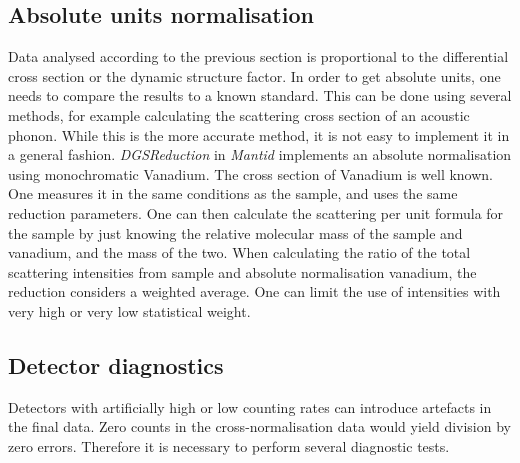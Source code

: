  
\subsection{Absolute units normalisation}
Data analysed according to the previous section is proportional to the differential cross section or the dynamic structure factor. In order to get absolute units, one needs to compare the results to a known standard. This can be done using several methods, for example calculating the scattering cross section of an acoustic phonon. While this is the more accurate method, it is not easy to implement it in a general fashion. \textit{DGSReduction} in \textit{Mantid} implements an absolute normalisation using monochromatic Vanadium. The cross section of Vanadium is well known. One measures it in the same conditions as the sample, and uses the same reduction parameters. One can then calculate the scattering per unit formula for the sample by just knowing the relative molecular mass of the sample and vanadium, and the mass of the two. When calculating the ratio of the total scattering intensities from sample and absolute normalisation vanadium, the reduction considers a weighted average. One can limit the use of intensities with very high or very low statistical weight. 


\subsection{Detector diagnostics}\label{sec:Physics-detdiag}
Detectors with artificially high or low counting rates can introduce artefacts in the final data. Zero counts in the cross-normalisation data would yield division by zero errors. Therefore it is necessary to perform several diagnostic tests.

